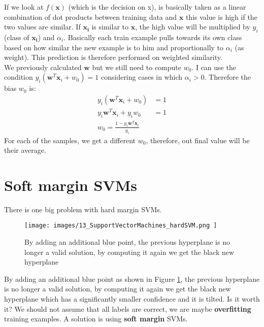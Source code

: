 If we look at $f(\pmb{x})$ (which is the decision on x), is basically taken as a
linear combination of dot products between training data and $\pmb{x}$ this value
is high if the two values are similar. If $\pmb{x_i}$ is similar to $\pmb{x}$, the
high value will be multiplied by $y_{i}$ (class of $\pmb{x_i}$) and $\alpha_{i}$.
Basically each train example pulls towards its own class based on how similar
the new example is to him and proportionally to $\alpha_{i}$ (as weight). This prediction
is therefore performed on weighted similarity.\\

We previously calculated $\pmb{w}$ but we still need to compute $w_{0}$. I can use
the condition $y_{i}(\pmb{w}^{T}\pmb{x}_{i}+ w_{0}) = 1$ considering cases in which
$\alpha_{i}> 0$. Therefore the bias $w_{0}$ is:
\begin{align*}
	y_{i}(\pmb{w}^{T}\pmb{x}_{i}+ w_{0})                & = 1 \\
	y_{i}\pmb{w}^{T}\pmb{x}_{i}+ y_{i}w_{0}             & = 1 \\
	w_{0}= \frac{1 - y_{i}\pmb{w}^{T}\pmb{x}_{i}}{y_{i}}
\end{align*}
For each of the samples, we get a different $w_{0}$, therefore, out final value
will be their average.

\section{Soft margin SVMs}
There is one big problem with hard margin SVMs.
\begin{figure}[H]
	\centering
	\texttt{[image: 
        images/13\_SupportVectorMachines\_hardSVM.png
    ]}
	\caption{By adding an additional blue point, the previous hyperplane is no longer
	a valid solution, by computing it again we get the black new hyperplane}
	\label{fig:hardSVM_problem}
\end{figure}
By adding an additional blue point as shown in Figure \ref{fig:hardSVM_problem},
the previous hyperplane is no longer a valid solution, by computing it again we get
the black new hyperplane which has a significantly smaller confidence and it is tilted.
Is it worth it? We should not assume that all labels are correct, we are maybe
\textbf{overfitting} training examples. A solution is using \textbf{soft margin}
SVMs.\\


